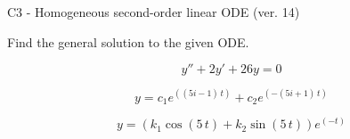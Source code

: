 \begin{exercise}
  \begin{exerciseTitle}C3 - Homogeneous second-order linear ODE (ver. 14)\end{exerciseTitle}
  \begin{exerciseStatement}
    
Find the general solution to the given ODE.

    
\[y''+2y'+26y = 0\]

  \end{exerciseStatement}
  \begin{exerciseAnswer}
    
\[y= c_{1} e^{\left(\left(5 i - 1\right) \, t\right)} + c_{2} e^{\left(-\left(5 i + 1\right) \, t\right)}\]

    
\[y= {\left(k_{1} \cos\left(5 \, t\right) + k_{2} \sin\left(5 \, t\right)\right)} e^{\left(-t\right)}\]

  \end{exerciseAnswer}
\end{exercise}